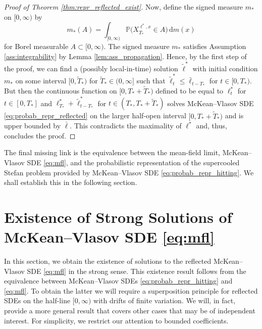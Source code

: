 \documentclass[11pt, a4paper]{article}
\theoremstyle{plain}
\theoremstyle{definition}
\theoremstyle{remark}
\numberwithin{equation}{section}
\newcommand{\pr}{\mathbb{P}}
\renewcommand{\d}{\mathrm{d}}
\begin{document}
\begin{proof}[Proof of Theorem \ref{thm:repr_reflected_exist}]
Now, define the signed measure $m_{\ast}$ on $[0, \infty)$ by
\begin{equation*}
    m_{\ast}(A) = \int_{[0, \infty)} \pr\bigl(X^{\ell^{\ast}, x}_{T_{\ast}} \in A\bigr) \, \d m(x)
\end{equation*}
for Borel measurable $A \subset [0, \infty)$. The signed measure $m_{\ast}$ satisfies Assumption \ref{ass:integrability} by Lemma \ref{lem:ass_propagation}. Hence, by the first step of the proof, we can find a (possibly local-in-time) solution $\tilde{\ell}^{\ast}$ with initial condition $m_{\ast}$ on some interval $[0, \tilde{T}_{\ast})$ for $\tilde{T}_{\ast} \in (0, \infty]$ such that $\tilde{\ell}^{\ast}_t \leq \bar{\ell}_{t - T_{\ast}}$ for $t \in [0, T_{\ast})$. But then the continuous function on $[0, T_{\ast} + \tilde{T}_{\ast})$ defined to be equal to $\ell^{\ast}_t$ for $t \in [0, T_{\ast}]$ and $\ell^{\ast}_{T_{\ast}} + \tilde{\ell}^{\ast}_{t - T_{\ast}}$ for $t \in (T_{\ast}, T_{\ast} + \tilde{T}_{\ast})$ solves McKean--Vlasov SDE \eqref{eq:probab_repr_reflected} on the larger half-open interval $[0, T_{\ast} + \tilde{T}_{\ast})$ and is upper bounded by $\bar{\ell}$. This contradicts the maximality of $\ell^{\ast}$ and, thus, concludes the proof.
\end{proof}

The final missing link is the equivalence between the mean-field limit, McKean--Vlasov SDE \eqref{eq:mfl}, and the probabilistic representation of the supercooled Stefan problem provided by McKean--Vlasov SDE \eqref{eq:probab_repr_hitting}. We shall establish this in the following section.




\section{Existence of Strong Solutions of McKean--Vlasov SDE \texorpdfstring{\eqref{eq:mfl}}{(EQ)}} \label{sec:strong_existence}

In this section, we obtain the existence of solutions to the reflected McKean--Vlasov SDE \eqref{eq:mfl} in the strong sense. This existence result follows from the equivalence between McKean--Vlasov SDEs \eqref{eq:probab_repr_hitting} and \eqref{eq:mfl}. To obtain the latter we will require a superposition principle for reflected SDEs on the half-line $[0, \infty)$ with drifts of finite variation. We will, in fact, provide a more general result that covers other cases that may be of independent interest. For simplicity, we restrict our attention to bounded coefficients.
\end{document}
